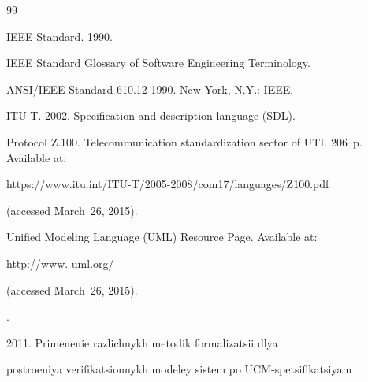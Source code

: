 















\renewcommand{\bibname}{\protect\rmfamily References}







{\small\frenchspacing


{%




\begin{thebibliography}{99}




IEEE Standard. 1990.


IEEE Standard Glossary of Software Engineering Terminology.


ANSI/IEEE Standard 610.12-1990.  New York, N.Y.: IEEE.




ITU-T. 2002. Specification and description language (SDL).


Protocol Z.100. Telecommunication standardization sector of UTI. 206~p. Available at:


{\sf https://www.itu.int/ITU-T/2005-2008/com17/languages/Z100.pdf}


(accessed March~26, 2015).




Unified Modeling Language (UML) Resource Page.  Available at:


{\sf http://www. uml.org/}


(accessed March~26, 2015).




.


2011. Primenenie razlichnykh metodik formalizatsii dlya


postroeniya verifikatsionnykh modeley sistem po UCM-spetsifikatsiyam



\end{thebibliography}}}
